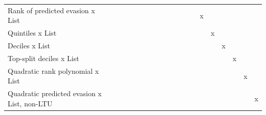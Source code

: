 \begin{tabular}{lcccccccccccccccccc}
Rank of predicted evasion x List&                     &                     &                     &                     &                     &                     &                     &                     &                     &                     &                     &                     &           x         &                     &                     &                     &                     &                     \\
Quintiles x List&                     &                     &                     &                     &                     &                     &                     &                     &                     &                     &                     &                     &                     &           x         &                     &                     &                     &                     \\
Deciles x List&                     &                     &                     &                     &                     &                     &                     &                     &                     &                     &                     &                     &                     &                     &           x         &                     &                     &                     \\
Top-split deciles x List&                     &                     &                     &                     &                     &                     &                     &                     &                     &                     &                     &                     &                     &                     &                     &           x         &                     &                     \\
Quadratic rank polynomial x List&                     &                     &                     &                     &                     &                     &                     &                     &                     &                     &                     &                     &                     &                     &                     &                     &           x         &                     \\
Quadratic predicted evasion x List, non-LTU&                     &                     &                     &                     &                     &                     &                     &                     &                     &                     &                     &                     &                     &                     &                     &                     &                     &           x         \\

\end{tabular}
